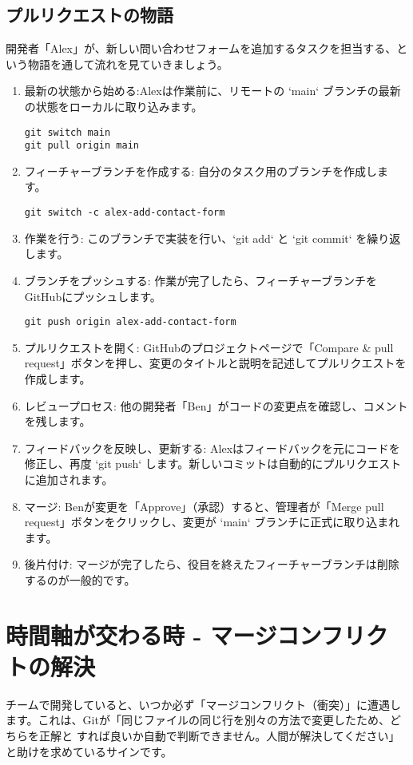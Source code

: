 \documentclass{ltjsarticle}
\begin{document}
\subsection{プルリクエストの物語}
開発者「Alex」が、新しい問い合わせフォームを追加するタスクを担当する、という物語を通して流れを見ていきましょう。
\begin{enumerate}
    \item 最新の状態から始める:Alexは作業前に、リモートの `main` ブランチの最新の状態をローカルに取り込みます。
    \begin{verbatim}
git switch main
git pull origin main
\end{verbatim}
    \item フィーチャーブランチを作成する: 自分のタスク用のブランチを作成します。
    \begin{verbatim}
git switch -c alex-add-contact-form
\end{verbatim}
    \item 作業を行う: このブランチで実装を行い、`git add` と `git commit` を繰り返します。
    \item ブランチをプッシュする: 作業が完了したら、フィーチャーブランチをGitHubにプッシュします。
    \begin{verbatim}
git push origin alex-add-contact-form
\end{verbatim}
    \item プルリクエストを開く: GitHubのプロジェクトページで「Compare & pull request」ボタンを押し、変更のタイトルと説明を記述してプルリクエストを作成します。
    \item レビュープロセス: 他の開発者「Ben」がコードの変更点を確認し、コメントを残します。
    \item フィードバックを反映し、更新する: Alexはフィードバックを元にコードを修正し、再度 `git push` します。新しいコミットは自動的にプルリクエストに追加されます。
    \item マージ: Benが変更を「Approve」（承認）すると、管理者が「Merge pull request」ボタンをクリックし、変更が `main` ブランチに正式に取り込まれます。
    \item 後片付け: マージが完了したら、役目を終えたフィーチャーブランチは削除するのが一般的です。
\end{enumerate}

\section{時間軸が交わる時 - マージコンフリクトの解決}
チームで開発していると、いつか必ず「マージコンフリクト（衝突）」に遭遇します。これは、Gitが「同じファイルの同じ行を別々の方法で変更したため、どちらを正解と
すれば良いか自動で判断できません。人間が解決してください」と助けを求めているサインです。
\end{document}
